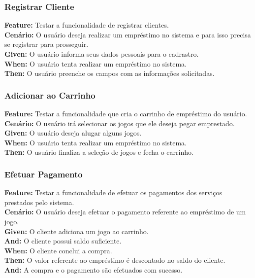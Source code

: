 \documentclass[a4paper, 12pt]{article}
\begin{document}
\subsubsection{Registrar Cliente}
\noindent
\textbf{Feature:} Testar a funcionalidade de registrar clientes. \\
\textbf{Cenário:} O usuário deseja realizar um empréstimo no sistema e para isso precisa se registrar para prosseguir. \\
\textbf{Given:} O usuário informa seus dados pessoais para o cadrastro. \\
\textbf{When:} O usuário tenta realizar um empréstimo no sistema. \\
\textbf{Then:} O usuário preenche os campos com as informações solicitadas. \\

\subsubsection{Adicionar ao Carrinho}
\noindent
\textbf{Feature:} Testar a funcionalidade que cria o carrinho de empréstimo do usuário. \\
\textbf{Cenário:} O usuário irá selecionar os jogos que ele deseja pegar emprestado. \\
\textbf{Given:} O usuário deseja alugar alguns jogos. \\
\textbf{When:} O usuário tenta realizar um empréstimo no sistema. \\
\textbf{Then:} O usuário finaliza a seleção de jogos e fecha o carrinho. \\

\subsubsection{Efetuar Pagamento} 
\noindent
\textbf{Feature:} Testar a funcionalidade de efetuar os pagamentos dos serviços prestados pelo sistema. \\
\textbf{Cenário:} O usuário deseja efetuar o pagamento referente ao empréstimo de um jogo. \\
\textbf{Given:} O cliente adiciona um jogo ao carrinho. \\
\textbf{And:} O cliente possui saldo suficiente. \\
\textbf{When:} O cliente conclui a compra. \\
\textbf{Then:} O valor referente ao empréstimo é descontado no saldo do cliente. \\
\textbf{And:} A compra e o pagamento são efetuados com sucesso. \\
\end{document}
